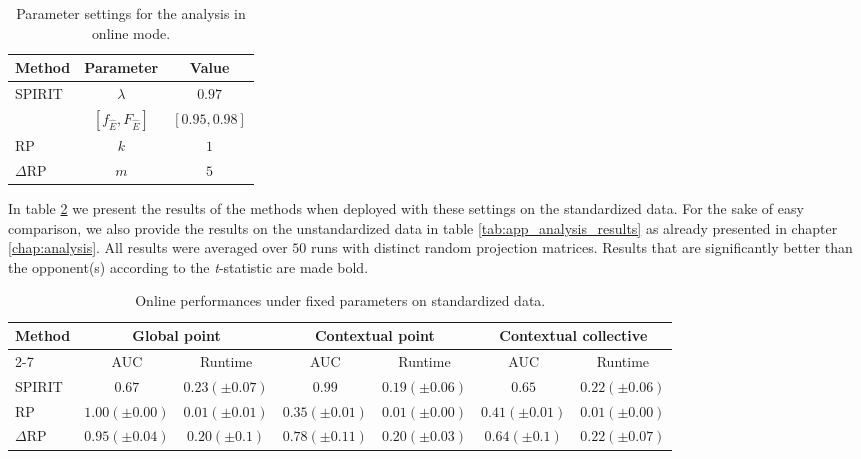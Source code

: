 \begin{table}[h]
	\centering
	\vspace{0.05cm}
	\caption{Parameter settings for the analysis in online mode.}
	\label{tab:app_analysis_parameters}
	\begin{tabular}{l c c}
		\toprule
		\textbf{Method}					& \textbf{Parameter}		& \textbf{Value}		\\
		\midrule
		\multirow{2}{*}{SPIRIT} & $\lambda$				&$	0.97	$	\\
		& $[f_{\hat{E}}, F_{\hat{E}}]$	&	$[0.95, 0.98]$ \\
		\midrule
		RP				& $k$						&	$1$			\\
		$\Delta$RP		& $m$						&	$5$			\\
		\bottomrule		
	\end{tabular}
	\vspace{0.1cm}
\end{table}

In table \ref{tab:app_analysis_results_standrp} we present the results of the methods when deployed with these settings on the standardized data. For the sake of easy comparison, we also provide the results on the unstandardized data in table \ref{tab:app_analysis_results} as already presented in chapter \ref{chap:analysis}. All results were averaged over $50$ runs with distinct random projection matrices. Results that are significantly better than the opponent(s) according to the \textit{t}-statistic are made bold. 

\begin{table}[h]
	\centering
	\vspace{0.1cm}
	\caption{Online performances under fixed parameters on standardized data.}
	\label{tab:app_analysis_results_standrp}
	\small
	\begin{tabular}{l c c c c c c}
		\toprule	
		\multirow{3}{*}{\textbf{Method}}				&  \multicolumn{2}{c}{\textbf{Global point}}	& \multicolumn{2}{c}{\textbf{Contextual point}} & \multicolumn{2}{c}{\textbf{Contextual collective}}\\	
		\cmidrule{2-7}
		& 	AUC 	& Runtime 	& AUC 	& Runtime 	& AUC 	& Runtime 	\\
		\midrule
		SPIRIT	& $0.67	 $	&$	0.23 (\pm 0.07)	$&$	\mathbf{0.99 }$	& $	0.19 (\pm 0.06)$	& 	$\mathbf{0.65}$	& $0.22	(\pm 0.06)$ \\
		
		RP  	& $\mathbf{1.00	(\pm 0.00)}$	& $\mathbf{0.01 (\pm 0.01)}$ & $0.35 (\pm 0.01)$	& $\mathbf{0.01 (\pm 0.00)}$	& 	$	0.41 (\pm 0.01)$	& $\mathbf{0.01	(\pm 0.00)}$ \\
		
		$\Delta$RP		& $0.95 (\pm 0.04)$	&	$0.20 (\pm 0.1)$	&	$0.78 (\pm 0.11)$	& 	$0.20 (\pm 0.03)$	&	$\mathbf{0.64 (\pm 0.1)}$		&  $0.22 (\pm 0.07)$ \\
		\bottomrule
	\end{tabular}
	\vspace{0.1cm}
\end{table}

